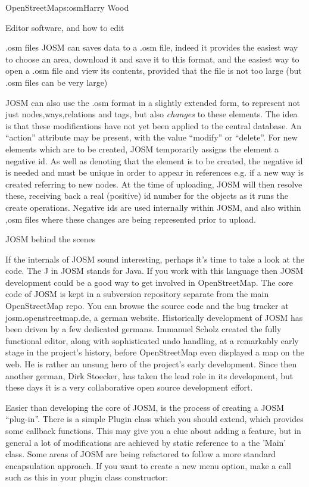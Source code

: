 \begin{aosachapter}{OpenStreetMap}{s:osm}{Harry Wood}
\begin{aosasect1}{Editor software, and how to edit}
\begin{aosasect2}{.osm files}
JOSM can saves data to a .osm file, indeed it provides the easiest way
to choose an area, download it and save it to this format, and the
easiest way to open a .osm file and view its contents, provided that
the file is not too large (but .osm files can be very large)

JOSM can also use the .osm format in a slightly extended form, to
represent not just nodes,ways,relations and tags, but also
\emph{changes} to these elements. The idea is that these modifications
have not yet been applied to the central database. An ``action''
attribute may be present, with the value ``modify'' or ``delete''. For
new elements which are to be created, JOSM temporarily assigns the
element a negative id. As well as denoting that the element is to be
created, the negative id is needed and must be unique in order to
appear in references e.g. if a new way is created referring to new
nodes. At the time of uploading, JOSM will then resolve these,
receiving back a real (positive) id number for the objects as it runs
the create operations. Negative ids are used internally within JOSM,
and also within ,osm files where these changes are being represented
prior to upload.

\end{aosasect2}

\begin{aosasect2}{JOSM behind the scenes}

If the internals of JOSM sound interesting, perhaps it's time to take
a look at the code. The J in JOSM stands for Java. If you work with
this language then JOSM development could be a good way to get
involved in OpenStreetMap. The core code of JOSM is kept in a
subversion repository separate from the main OpenStreetMap repo. You
can browse the source code and the bug tracker at
josm.openstreetmap.de, a german website. Historically development of
JOSM has been driven by a few dedicated germans. Immanuel Scholz
created the fully functional editor, along with sophisticated undo
handling, at a remarkably early stage in the project's history, before
OpenStreetMap even displayed a map on the web. He is rather an unsung
hero of the project's early development. Since then another german,
Dirk Stoecker, has taken the lead role in its development, but these
days it is a very collaborative open source development effort.

Easier than developing the core of JOSM, is the process of creating a
JOSM ``plug-in''. There is a simple Plugin class which you should
extend, which provides some callback functions. This may give you a
clue about adding a feature, but in general a lot of modifications are
achieved by static reference to a the 'Main' class. Some areas of JOSM
are being refactored to follow a more standard encapsulation
approach. If you want to create a new menu option, make a call such as
this in your plugin class constructor:


\end{aosasect2}
\end{aosasect1}
\end{aosachapter}
